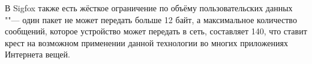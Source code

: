 В Sigfox также есть жёсткое ограничение по объёму пользовательских данных ""--- 
один пакет не может передать больше 12 байт, а максимальное количество 
сообщений, которое устройство может передать в сеть, составляет 140, что ставит 
крест на возможном применении данной технологии во многих приложениях Интернета 
вещей.









